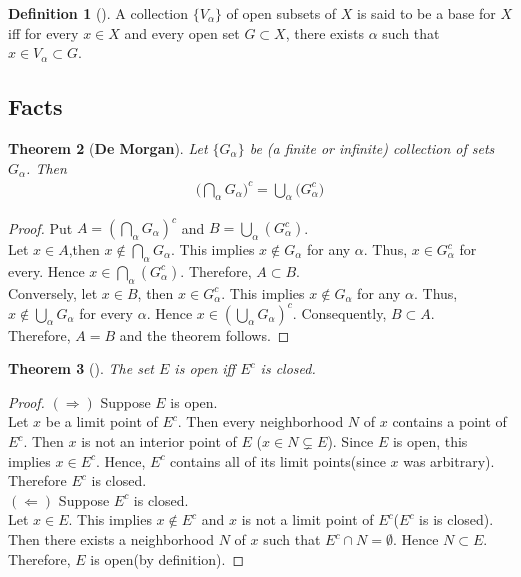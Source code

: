 \documentclass[	DIV=calc,paper=a4,fontsize=11pt]{scrartcl}	 	%
\newtheorem{thm}{Theorem}[section]
\theoremstyle{definition}
\newtheorem{defn}[thm]{Definition}
\theoremstyle{plain}
\theoremstyle{remark}
\begin{document}
\begin{defn}[\textbf{\color{blue}{Base}}]
A collection $\{V_{\alpha}\}$ of open subsets of $X$ is said to be a base for $X$ iff for every $x\in X$ and every open set $G\subset X$, there exists $\alpha$ such that $x\in V_{\alpha}\subset G$.
\end{defn}

\subsection{Facts}
\begin{thm}[\textbf{De Morgan}]
Let $\{G_{\alpha}\}$ be (a finite or infinite) collection of sets $G_{\alpha}$. Then
\begin{align}
\biggl(\bigcap_{\alpha} G_{\alpha} \biggl)^c=\bigcup_{\alpha}  \biggl(G_{\alpha}^c \biggl)
\end{align}
\end{thm}
\begin{proof}
Put $A= (\bigcap_{\alpha} G_{\alpha} )^c$ and $B=\bigcup_{\alpha}  (G_{\alpha}^c )$.\\
Let $x\in A$,then $x\notin \bigcap_{\alpha} G_{\alpha}$. This implies $x\notin G_{\alpha}$ for any $\alpha$. Thus, $x\in G_{\alpha}^c$ for every. Hence $x\in \bigcap_{\alpha}  (G_{\alpha}^c )$. Therefore, $A\subset B$.\\

Conversely, let $x\in B$, then $x\in G_{\alpha}^c$. This implies $x\notin G_{\alpha}$ for any $\alpha$. Thus, $x\notin \bigcup_{\alpha} G_{\alpha}$ for every $\alpha$. Hence $x\in  (\bigcup_{\alpha} G_{\alpha} )^c$. Consequently, $B\subset A$.\\
Therefore, $A=B$ and the theorem follows.
\end{proof}

\begin{thm}[]
The set $E$ is open iff $E^c$ is closed.
\end{thm}

\begin{proof}
$(\Rightarrow)$ Suppose $E$ is open. \\
Let $x$ be a limit point of $E^c$. Then every neighborhood $N$ of $x$ contains a point of $E^c$. Then $x$ is not an interior point of $E$ ($ x\in N\subsetneq E$). Since $E$ is open, this implies $x\in E^c$. Hence, $E^c$ contains all of its limit points(since $x$ was arbitrary). Therefore $E^c$ is closed.\\
$(\Leftarrow)$ Suppose $E^c$ is closed.\\
Let $x\in E$. This implies $x\notin E^c$ and $x$ is not a limit point of $E^c$($E^c$ is is closed). Then there exists a neighborhood $N$ of $x$ such that $E^c\cap N=\emptyset$. Hence $N\subset E$. Therefore, $E$ is open(by definition).

\end{proof}
\end{document}
